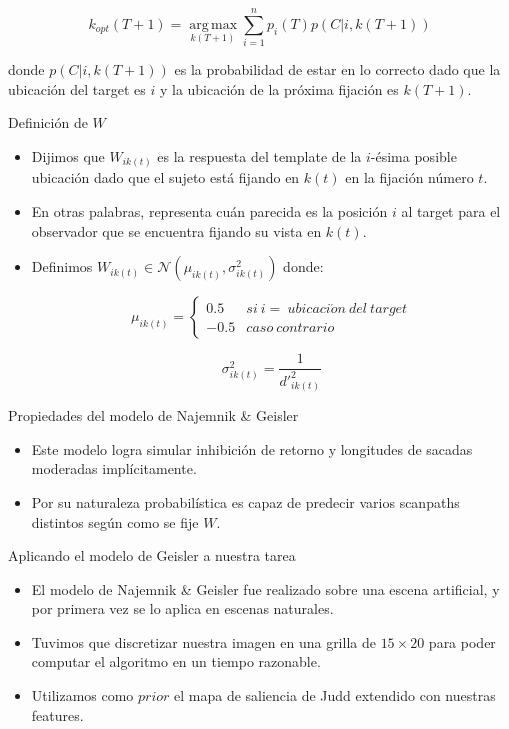 \documentclass[compress]{beamer}
\DeclareMathOperator*{\argmax}{arg\,max}
\begin{document}

\begin{frame}

$$k_{opt}(T+1) = \argmax\limits_{k(T+1)} \sum_{i=1}^n p_i(T)p(C|i,k(T+1))$$

donde $p(C|i,k(T+1))$ es la probabilidad de estar en lo correcto dado que la ubicación del target es $i$ y la ubicación de la próxima fijación es $k(T+1)$.
\end{frame}

\begin{frame}{Definición de $W$}
\begin{itemize}
\item Dijimos que $W_{ik(t)}$ es la respuesta del template de la $i$-ésima posible ubicación dado que el sujeto está fijando en $k(t)$ en la fijación número $t$. 

\item En otras palabras, representa cuán parecida es la posición $i$ al target para el observador que se encuentra fijando su vista en $k(t)$. 
\item Definimos $W_{ik(t)} \in \mathcal{N}(\mu_{ik(t)}, \sigma^2_{ik(t)})$ donde:

$$ \mu_{ik(t)}
= \left\{ \begin{array}{lc}
             0.5 &  si \ i = \ ubicaci\acute{o}n \ del \ target \\
             -0.5 &  caso \ contrario 
          \end{array}
   \right.$$

$$ \sigma^2_{ik(t)} = \displaystyle\frac{1}{d'^2_{ik(t)}}$$ 
\end{itemize}
\end{frame}

\begin{frame}{Propiedades del modelo de Najemnik \& Geisler}
\begin{itemize}
\item Este modelo logra simular inhibición de retorno y longitudes de sacadas moderadas implícitamente. 
\item Por su naturaleza probabilística es capaz de predecir varios scanpaths distintos según como se fije $W$.
\end{itemize}
\end{frame}

\begin{frame}{Aplicando el modelo de Geisler a nuestra tarea}
\begin{itemize}
\item El modelo de Najemnik \& Geisler fue realizado sobre una escena artificial, y por primera vez se lo aplica en escenas naturales. 
\item Tuvimos que discretizar nuestra imagen en una grilla de $15 \times 20$ para poder computar el algoritmo en un tiempo razonable.
\item Utilizamos como $prior$ el mapa de saliencia de Judd extendido con nuestras features.
\end{itemize}
\end{frame}
\end{document}

